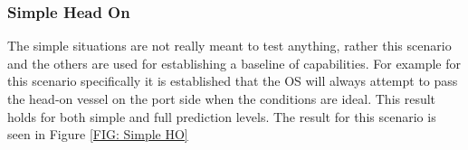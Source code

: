
\clearpage
\subsubsection{Simple Head On}
The simple situations are not really meant to test anything, rather this scenario and the others are used for establishing
a baseline of capabilities. For example for this scenario specifically it is established that the OS will always attempt to
pass the head-on vessel on the port side when the conditions are ideal. This result holds for both simple and
full prediction levels. The result for this scenario is seen in Figure \ref{FIG: Simple HO}

